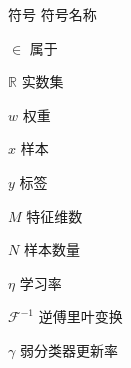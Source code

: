 \XDUpremainmatter

\begin{symbollist}
\item [符号] \hspace{12em} {符号名称}
\item [$\in$]\hspace{12.5em} {属于}
\item [$\mathbb{R}$]\hspace{12.5em} {实数集}
\item [$w$] \hspace{12.5em} {权重}
\item [$x$] \hspace{12.5em} {样本}
\item [$y$] \hspace{12.5em} {标签}
\item [$M$] \hspace{12.5em} {特征维数}
\item [$N$] \hspace{12.5em} {样本数量}
\item [$\eta$] \hspace{12.5em} {学习率}
\item [$\mathcal{F}^{-1}$] \hspace{12.5em} {逆傅里叶变换}
\item [$\gamma$] \hspace{12.5em} {弱分类器更新率}
\end{symbollist}

